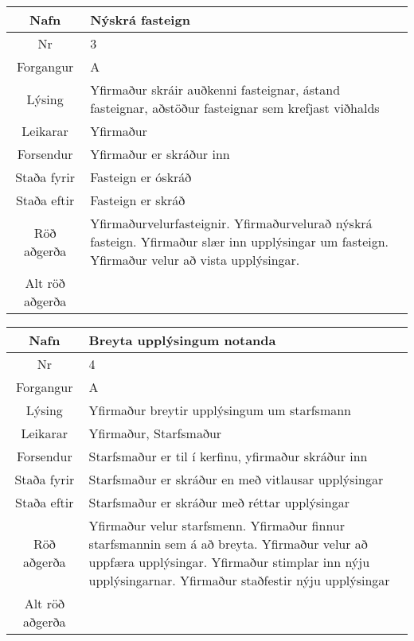 \begin{table}[h!]\centering
\begin{tabular}{|c|p{10cm}|}
\hline
Nafn&Nýskrá fasteign\\
\hline
Nr&3\\
\hline
Forgangur&A\\
\hline
Lýsing&Yfirmaður skráir auðkenni fasteignar, ástand fasteignar, aðstöður fasteignar sem krefjast viðhalds\\
\hline
Leikarar&Yfirmaður\\
\hline
Forsendur&Yfirmaður er skráður inn\\
\hline
Staða fyrir&Fasteign er óskráð\\
\hline
Staða eftir&Fasteign er skráð\\
\hline
Röð aðgerða&Yfirmaðurvelurfasteignir. Yfirmaðurvelurað nýskrá fasteign. Yfirmaður slær inn upplýsingar um fasteign. Yfirmaður velur að vista upplýsingar.\\
\hline
Alt röð aðgerða&\\
\hline
\end{tabular}
\end{table}
\caption{Use case 3}\label{tab:use_case_3}
\begin{table}[h!]\centering
\begin{tabular}{|c|p{10cm}|}
\hline
Nafn&Breyta upplýsingum notanda\\
\hline
Nr&4\\
\hline
Forgangur&A\\
\hline
Lýsing&Yfirmaður breytir upplýsingum um starfsmann\\
\hline
Leikarar&Yfirmaður, Starfsmaður\\
\hline
Forsendur&Starfsmaður er til í kerfinu, yfirmaður skráður inn\\
\hline
Staða fyrir&Starfsmaður er skráður en með vitlausar upplýsingar\\
\hline
Staða eftir&Starfsmaður er skráður með réttar upplýsingar\\
\hline
Röð aðgerða&Yfirmaður velur starfsmenn. Yfirmaður finnur starfsmannin sem á að breyta. Yfirmaður velur að uppfæra upplýsingar. Yfirmaður stimplar inn nýju upplýsingarnar. Yfirmaður staðfestir nýju upplýsingar\\
\hline
Alt röð aðgerða&\\
\hline
\end{tabular}
\end{table}
\caption{Use case 4}\label{tab:use_case_4}
